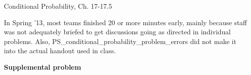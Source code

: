 \documentclass[handout]{mcs}
\begin{document}

\begin{staffnotes}
Conditional Probability, Ch. 17-17.5

In Spring '13, most teams finished 20 or more minutes early, mainly
because staff was not adequately briefed to get discussions going as
directed in individual problems.  Also,
PS\_conditional\_probability\_problem\_errors did not make it into the
actual handout used in class.
\end{staffnotes}








\begin{center}
\textbf{\large Supplemental problem}
\end{center}




\end{document}
